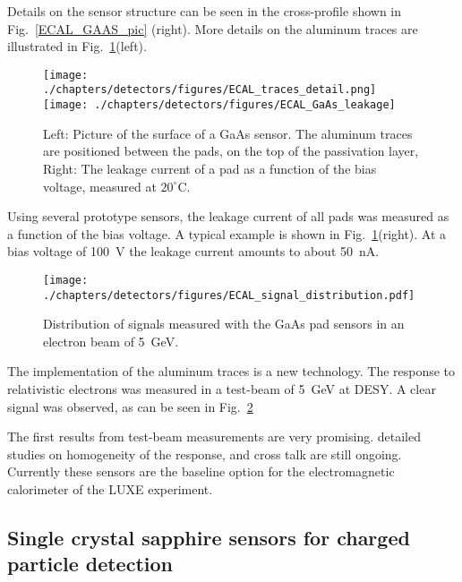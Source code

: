 Details on the sensor structure can be seen in the cross-profile shown in Fig.~\ref{ECAL_GAAS_pic} (right).
More details on the aluminum traces are illustrated in Fig.~\ref{ECAL_traces_detail}(left).
\begin{figure}[ht!]
\begin{center}
    \texttt{[image: ./chapters/detectors/figures/ECAL\_traces\_detail.png]}
    \hfill
    \texttt{[image: ./chapters/detectors/figures/ECAL\_GaAs\_leakage]}
    \caption{Left: Picture of the surface of a GaAs sensor. The aluminum traces are positioned between the pads, on the top of the passivation layer, Right: The leakage current of a pad as a function of the bias voltage, measured at $20^\circ$C.}
    \label{ECAL_traces_detail}
\end{center}
\end{figure}

Using several prototype sensors, the leakage current of all pads was measured as a function of the bias voltage. A typical example is shown in Fig.~\ref{ECAL_traces_detail}(right). At a bias voltage of 100~V the leakage current amounts to about 50~nA.
\begin{figure}[htb]
\begin{center}
    \texttt{[image: ./chapters/detectors/figures/ECAL\_signal\_distribution.pdf]}
 \caption{Distribution of signals measured with the GaAs pad sensors in an electron beam of 5~GeV.}
   \label{ECAL_signal}
\end{center}
\end{figure}

The implementation of the aluminum traces is a new technology. The response to relativistic electrons was measured in a test-beam of 5~GeV at DESY. A clear signal was observed, as can be seen in Fig.~\ref{ECAL_signal}

The first results from test-beam measurements are very promising. detailed studies on homogeneity of the response, and cross talk are still ongoing. Currently these sensors are the baseline option for the electromagnetic calorimeter of the LUXE experiment.

\subsection{Single crystal sapphire sensors for charged particle detection }



